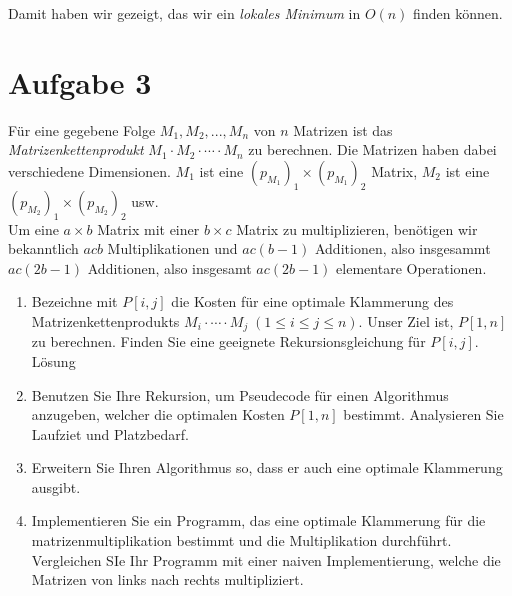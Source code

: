 \documentclass[11pt,a4paper,ngerman]{article}
\begin{document}
Damit haben wir gezeigt, das wir ein \emph{lokales Minimum} in $O(n)$ finden können.

\section*{Aufgabe 3}

Für eine gegebene Folge $M_1 , M_2, ... , M_n$ von $n$ Matrizen ist das \emph{Matrizenkettenprodukt} $M_1 \cdot M_2 \cdot \cdots \cdot M_n$ zu berechnen. Die Matrizen haben dabei verschiedene Dimensionen. $M_1$ ist eine $\left( p_{M_1} \right)_1 \times \left( p_{M_1} \right)_2$ Matrix, $M_2$ ist eine $\left( p_{M_2} \right)_1 \times \left( p_{M_2} \right)_2$ usw.\\

Um eine $a\times b$ Matrix mit einer $b \times c$ Matrix zu multiplizieren, benötigen wir bekanntlich $acb$ Multiplikationen und $ac\left( b - 1 \right)$ Additionen, also insgesammt $ac \left( 2b - 1\right)$ Additionen, also insgesamt $ac\left( 2b - 1\right)$ elementare Operationen.

\begin{enumerate}[\bfseries (a)]


\item Bezeichne mit $P[i,j]$ die Kosten für eine optimale Klammerung des Matrizenkettenprodukts $M_i \cdot \cdots \cdot M_j \; ( 1 \leq i \leq j \leq n)$. Unser Ziel ist, $P[1,n]$ zu berechnen. Finden Sie eine geeignete Rekursionsgleichung für $P[i,j]$.\\
Lösung

\item Benutzen Sie Ihre Rekursion, um Pseudecode für einen Algorithmus anzugeben, welcher die optimalen Kosten $P[1,n]$ bestimmt. Analysieren Sie Laufziet und Platzbedarf.


\item Erweitern Sie Ihren Algorithmus so, dass er auch eine optimale Klammerung ausgibt.\\


\item Implementieren Sie ein Programm, das eine optimale Klammerung für die matrizenmultiplikation bestimmt und die Multiplikation durchführt. Vergleichen SIe Ihr Programm mit einer naiven Implementierung, welche die Matrizen von links nach rechts multipliziert.

\end{enumerate}

\label{LastPage}
\end{document}
